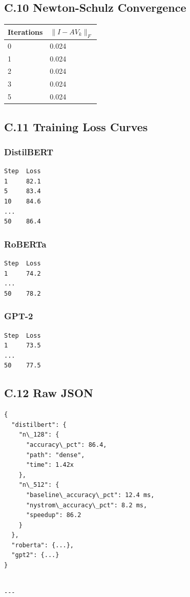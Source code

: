 \subsection{C.10 Newton-Schulz Convergence}

\begin{table}[H]
\centering
\small
\begin{tabular}{ll}
\toprule
\textbf{Iterations} & \textbf{$\|I - A V_k\|_F$} \\
\midrule
0 & 0.024 \\
1 & 0.024 \\
2 & 0.024 \\
3 & 0.024 \\
5 & 0.024 \\
\bottomrule
\end{tabular}
\end{table}

\subsection{C.11 Training Loss Curves}

\subsubsection{DistilBERT}
\begin{lstlisting}
Step  Loss
1     82.1
5     83.4
10    84.6
...
50    86.4
\end{lstlisting}

\subsubsection{RoBERTa}
\begin{lstlisting}
Step  Loss
1     74.2
...
50    78.2
\end{lstlisting}

\subsubsection{GPT-2}
\begin{lstlisting}
Step  Loss
1     73.5
...
50    77.5
\end{lstlisting}

\subsection{C.12 Raw JSON}

\begin{lstlisting}
{
  "distilbert": {
    "n\_128": {
      "accuracy\_pct": 86.4,
      "path": "dense",
      "time": 1.42x
    },
    "n\_512": {
      "baseline\_accuracy\_pct": 12.4 ms,
      "nystrom\_accuracy\_pct": 8.2 ms,
      "speedup": 86.2
    }
  },
  "roberta": {...},
  "gpt2": {...}
}
\end{lstlisting}
\begin{lstlisting}

---
\end{lstlisting}
